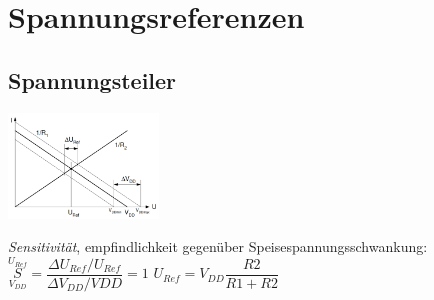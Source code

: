 
\section{Spannungsreferenzen}
\subsection{Spannungsteiler}

 	\begin{minipage}{150pt}
	 	{  }
 	\end{minipage}
 	\begin{minipage}{150pt}
	\includegraphics[width = 4cm]{images/spgref/05_spgteiler}
 	\end{minipage}
 	\begin{minipage}{200pt}
		\emph{Sensitivität}, empfindlichkeit gegenüber Speisespannungsschwankung:\newline $\underset{V_{DD}}{\overset{U_{Ref}}{S}} = \dfrac{\Delta  U_{Ref}/ U_{Ref}}{\Delta V_{DD}/V{DD}} = 1$\newline
		$U_{Ref} = V_{DD}\dfrac{R2}{R1+R2}$
	\end{minipage}\\
